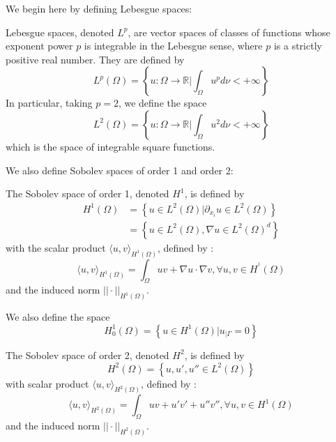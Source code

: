 We begin here by defining Lebesgue spaces:

\begin{Def}
	Lebesgue spaces, denoted $L^p$, are vector spaces of classes of functions whose exponent power $p$ is integrable in the Lebesgue sense, where $p$ is a strictly positive real number. They are defined by
	\begin{equation*}
		L^p(\Omega)=\left\{u:\Omega\rightarrow\mathbb{R}|\int_\Omega u^p d\nu<+\infty\right\}
	\end{equation*}
	In particular, taking $p=2$, we define the space
	\begin{equation*}
		L^2(\Omega)=\left\{u:\Omega\rightarrow\mathbb{R}|\int_\Omega u^2 d\nu<+\infty\right\}
	\end{equation*}
	which is the space of integrable square functions.
\end{Def}

We also define Sobolev spaces of order 1 and order 2:

\begin{Def}
	The Sobolev space of order 1, denoted $H^1$, is defined by
	\begin{align*}
		H^1(\Omega)&=\left\{u\in L^2(\Omega)|\partial_{x_i}u\in L^2(\Omega)\right\} \\
		&=\left\{u\in L^2(\Omega),\nabla u\in L^2(\Omega)^d\right\}
	\end{align*}
	with the scalar product $\langle u, v\rangle_{H^1(\Omega)}$, defined by :
	\begin{equation*}
		\langle u, v\rangle_{H^1(\Omega)} = \int_\Omega uv + \nabla u \cdot \nabla v, \forall u,v\in H^^1(\Omega)
	\end{equation*}
	and the induced norm $||\cdot||_{H^1(\Omega)}$.
	
	We also define the space
	\begin{equation*}
		H_0^1(\Omega)=\left\{u\in H^1(\Omega)|u_{|\Gamma}=0\right\}
	\end{equation*}
	
	The Sobolev space of order 2, denoted $H^2$, is defined by
	\begin{equation*}
		H^2(\Omega)=\left\{u,u',u''\in L^2(\Omega)\right\}
	\end{equation*}
	with scalar product $\langle u, v\rangle_{H^2(\Omega)}$, defined by :
	\begin{equation*}
		\langle u, v\rangle_{H^2(\Omega)} = \int_\Omega uv + u'v' + u''v'', \forall u,v\in H^1(\Omega)
	\end{equation*}
	and the induced norm $||\cdot||_{H^2(\Omega)}$.
\end{Def}

